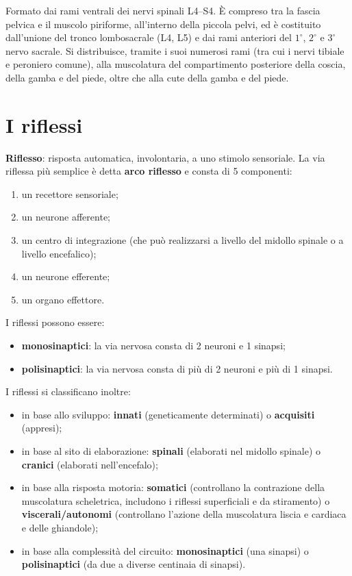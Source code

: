 Formato dai rami ventrali dei nervi spinali L4--S4. È compreso tra la fascia
pelvica e il muscolo piriforme, all'interno della piccola pelvi, ed è
costituito dall'unione del tronco lombosacrale (L4, L5) e dai rami
anteriori del $1^\circ$, $2^\circ$ e $3^\circ$ nervo sacrale. Si distribuisce,
tramite i suoi numerosi rami (tra cui i nervi tibiale e peroniero comune),
alla muscolatura del compartimento posteriore della coscia, della gamba e
del piede, oltre che alla cute della gamba e del piede.

\section{I riflessi}

\textbf{Riflesso}: risposta automatica, involontaria, a uno stimolo
sensoriale. La via riflessa più semplice è detta \textbf{arco riflesso} e
consta di 5 componenti:
\begin{enumerate}
  \item un recettore sensoriale;
  \item un neurone afferente;
  \item un centro di integrazione (che può realizzarsi a livello del midollo
    spinale o a livello encefalico);
  \item un neurone efferente;
  \item un organo effettore.
\end{enumerate}

I riflessi possono essere:
\begin{itemize}
  \item \textbf{monosinaptici}: la via nervosa consta di 2 neuroni e 1
    sinapsi;
  \item \textbf{polisinaptici}: la via nervosa consta di più di 2 neuroni e
    più di 1 sinapsi.
\end{itemize}

I riflessi si classificano inoltre:
\begin{itemize}
  \item in base allo sviluppo: \textbf{innati} (geneticamente determinati) o
    \textbf{acquisiti} (appresi);
  \item in base al sito di elaborazione: \textbf{spinali} (elaborati nel
    midollo spinale) o \textbf{cranici} (elaborati nell'encefalo);
  \item in base alla risposta motoria: \textbf{somatici} (controllano la
    contrazione della muscolatura scheletrica, includono i riflessi
    superficiali e da stiramento) o \textbf{viscerali/autonomi}
    (controllano l'azione della muscolatura liscia e cardiaca e delle
    ghiandole);
  \item in base alla complessità del circuito: \textbf{monosinaptici} (una
    sinapsi) o \textbf{polisinaptici} (da due a diverse centinaia di
    sinapsi).
\end{itemize}

